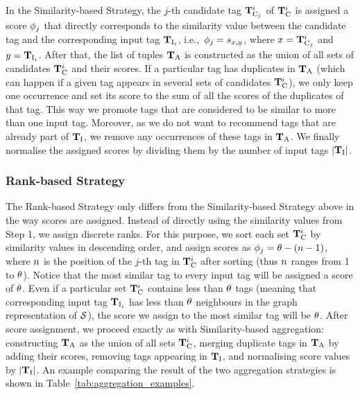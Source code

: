 In the Similarity-based Strategy, the $j$-th candidate tag $\mathbf{T}^i_{\text{C}_j}$ of $\mathbf{T}_{\text{C}}^i$ is assigned a score $\phi_j$ that directly corresponds to the similarity value between the candidate tag and the corresponding input tag $\mathbf{T}_{\text{I}_i}$, i.e.,~$\phi_j = s_{x,y}$, where $x=\mathbf{T}^i_{\text{C}_j}$ and $y=\mathbf{T}_{\text{I}_i}$. After that, the list of tuples $\mathbf{T}_{\text{A}}$ is constructed as the union of all sets of candidates $\mathbf{T}_{\text{C}}^i$ and their scores. 
If a particular tag has duplicates in $\mathbf{T}_{\text{A}}$ (which can happen if a given tag appears in several sets of candidates $\mathbf{T}_{\text{C}}^i$), we only keep one occurrence and set its score to the sum of all the scores of the duplicates of that tag. This way we promote tags that are considered to be similar to more than one input tag. Moreover, as we do not want to recommend tags that are already part of $\mathbf{T}_{\text{I}}$, we remove any occurrences of these tags in $\mathbf{T}_{\text{A}}$. 
We finally normalise the assigned scores by dividing them by the number of input tags $|\mathbf{T}_{\text{I}}|$. 

\subsubsection{Rank-based Strategy}

The Rank-based Strategy only differs from the Similarity-based Strategy above in the way scores are assigned. Instead of directly using the similarity values from Step 1, we assign discrete ranks. For this purpose, we sort each set $\mathbf{T}_{\text{C}}^i$ by similarity values in descending order, and assign scores as
$\phi_j = \theta - (n -1)$, 
where $n$ is the position of the $j$-th tag in $\mathbf{T}_{\text{C}}^i$ after sorting (thus $n$ ranges from 1 to $\theta$). Notice that the most similar tag to every input tag will be assigned a score of $\theta$. Even if a particular set $\mathbf{T}_{\text{C}}^i$ contains less than $\theta$ tags (meaning that corresponding input tag $\mathbf{T}_{\text{I}_i}$ has less than $\theta$ neighbours in the graph representation of $\mathcal{S}$), the score we assign to the most similar tag will be $\theta$. 
After score assignment, we proceed exactly as with Similarity-based aggregation: constructing $\mathbf{T}_{\text{A}}$ as the union of all sets $\mathbf{T}_{\text{C}}^i$, merging duplicate tags in $\mathbf{T}_{\text{A}}$ by adding their scores, removing tags appearing in $\mathbf{T}_{\text{I}}$, and normalising score values by $|\mathbf{T}_{\text{I}}|$. An example comparing the result of the two aggregation strategies is shown in Table~\ref{tab:aggregation_examples}.

